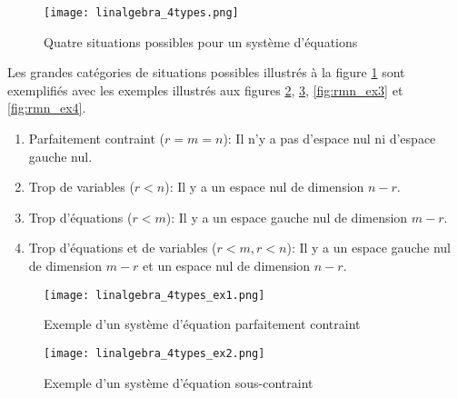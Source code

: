 \begin{figure}[htp]
	\centering
		\texttt{[image: linalgebra\_4types.png]}
	\caption{Quatre situations possibles pour un système d'équations}
	\label{fig:rmn}
\end{figure}

Les grandes catégories de situations possibles illustrés à la figure \ref{fig:rmn} sont exemplifiés avec les exemples illustrés aux figures \ref{fig:rmn_ex1}, \ref{fig:rmn_ex2}, \ref{fig:rmn_ex3} et \ref{fig:rmn_ex4}.

\begin{enumerate}
    \item Parfaitement contraint ($r=m=n$): Il n'y a pas d'espace nul ni d'espace gauche nul.
    \item Trop de variables ($r<n$): Il y a un espace nul de dimension $n-r$.
    \item Trop d'équations ($r<m$): Il y a un espace gauche nul de dimension $m-r$.
    \item Trop d'équations et de variables ($r<m,r<n$): Il y a un espace gauche nul de dimension $m-r$ et un espace nul de dimension $n-r$.
\end{enumerate}




\newpage
\begin{example}
\begin{figure}[H]
	\centering
		\texttt{[image: linalgebra\_4types\_ex1.png]}
	\caption{Exemple d'un système d'équation parfaitement contraint}
	\label{fig:rmn_ex1}
\end{figure}
\end{example}

\begin{example}
\begin{figure}[H]
	\centering
		\texttt{[image: linalgebra\_4types\_ex2.png]}
	\caption{Exemple d'un système d'équation sous-contraint}
	\label{fig:rmn_ex2}
\end{figure}
\end{example}

